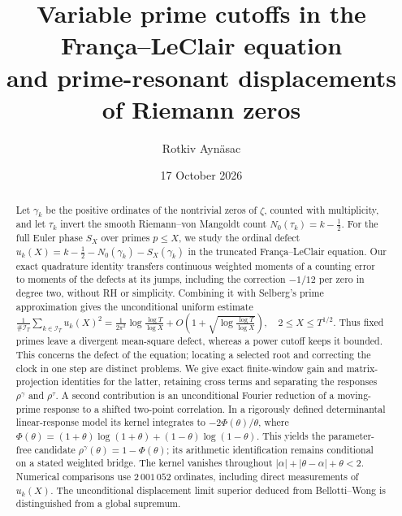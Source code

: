 \documentclass[11pt,reqno]{amsart}
\numberwithin{equation}{section}
\theoremstyle{plain}
\theoremstyle{definition}
\theoremstyle{remark}
\newcommand{\NO}{N_0}
\begin{document}
\title[Variable prime cutoffs in the Fran\c{c}a--LeClair equation]{Variable prime cutoffs in the Fran\c{c}a--LeClair equation\\ and prime-resonant displacements of Riemann zeros}
\author{Rotkiv Ayn\"asac}
\date{17 October 2026}

\begin{abstract}
Let $\gamma_k$ be the positive ordinates of the nontrivial zeros of $\zeta$, counted with multiplicity, and let $\tau_k$ invert the smooth Riemann--von Mangoldt count $\NO(\tau_k)=k-\frac12$. For the full Euler phase $S_X$ over primes $p\le X$, we study the ordinal defect $u_k(X)=k-\frac12-\NO(\gamma_k)-S_X(\gamma_k)$ in the truncated Fran\c{c}a--LeClair equation. Our exact quadrature identity transfers continuous weighted moments of a counting error to moments of the defects at its jumps, including the correction $-1/12$ per zero in degree two, without RH or simplicity. Combining it with Selberg's prime approximation gives the unconditional uniform estimate
$ \frac1{\#\mathcal I_T}\sum_{k\in\mathcal I_T}u_k(X)^2
 =\frac1{2\pi^2}\log\frac{\log T}{\log X}
 +O\!\left(1+\sqrt{\log\frac{\log T}{\log X}}\right),\quad 2\le X\le T^{1/2}.$
Thus fixed primes leave a divergent mean-square defect, whereas a power cutoff keeps it bounded. This concerns the defect of the equation; locating a selected root and correcting the clock in one step are distinct problems. We give exact finite-window gain and matrix-projection identities for the latter, retaining cross terms and separating the responses $\rho^\gamma$ and $\rho^\tau$. A second contribution is an unconditional Fourier reduction of a moving-prime response to a shifted two-point correlation. In a rigorously defined determinantal linear-response model its kernel integrates to $-2\Phi(\theta)/\theta$, where $\Phi(\theta)=(1+\theta)\log(1+\theta)+(1-\theta)\log(1-\theta)$. This yields the parameter-free candidate $\rho^\gamma(\theta)=1-\Phi(\theta)$; its arithmetic identification remains conditional on a stated weighted bridge. The kernel vanishes throughout $|\alpha|+|\theta-\alpha|+\theta<2$. Numerical comparisons use $2\,001\,052$ ordinates, including direct measurements of $u_k(X)$. The unconditional displacement limit superior deduced from Bellotti--Wong is distinguished from a global supremum.
\end{abstract}

\maketitle
{}
\end{document}
